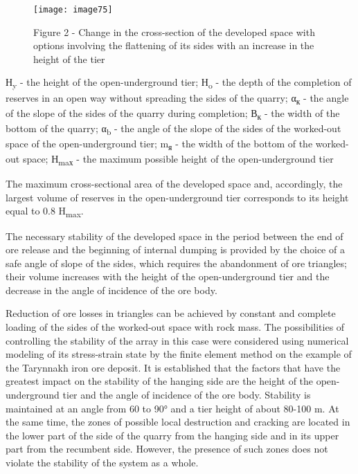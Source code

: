 \begin{figure}[H]
    \centering
    \texttt{[image: image75]}
    \caption*{Figure 2 - Change in the cross-section of the developed space with
options involving the flattening of its sides with an increase in the
height of the tier}
\end{figure}

\begin{multicols}{2}
Н\textsubscript{y} - the height of the open-underground tier;
Н\textsubscript{o} - the depth of the completion of reserves in an open
way without spreading the sides of the quarry; α\textsubscript{к} - the
angle of the slope of the sides of the quarry during completion;
В\textsubscript{к} - the width of the bottom of the quarry;
α\textsubscript{b} - the angle of the slope of the sides of the
worked-out space of the open-underground tier; m\textsubscript{я} - the
width of the bottom of the worked-out space; Н\textsubscript{maх} - the
maximum possible height of the open-underground tier

The maximum cross-sectional area of the developed space and,
accordingly, the largest volume of reserves in the open-underground tier
corresponds to its height equal to 0.8 H\textsubscript{max}.

The necessary stability of the developed space in the period between the
end of ore release and the beginning of internal dumping is provided by
the choice of a safe angle of slope of the sides, which requires the
abandonment of ore triangles; their volume increases with the height of
the open-underground tier and the decrease in the angle of incidence of
the ore body.

Reduction of ore losses in triangles can be achieved by constant and
complete loading of the sides of the worked-out space with rock mass.
The possibilities of controlling the stability of the array in this case
were considered using numerical modeling of its stress-strain state by
the finite element method on the example of the Tarynnakh iron ore
deposit. It is established that the factors that have the greatest
impact on the stability of the hanging side are the height of the
open-underground tier and the angle of incidence of the ore body.
Stability is maintained at an angle from 60 to 90° and a tier height of
about 80-100 m. At the same time, the zones of possible local
destruction and cracking are located in the lower part of the side of
the quarry from the hanging side and in its upper part from the
recumbent side. However, the presence of such zones does not violate the
stability of the system as a whole.


\end{multicols}
